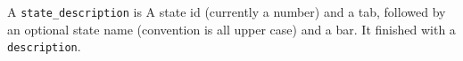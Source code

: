  A {\tt state\_description} is 
A state id (currently a number) and a tab, followed
by an optional state name (convention is all upper case)
and a bar. It finished with a {\tt description}.